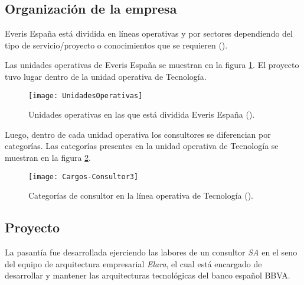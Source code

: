 \subsection{Organización de la empresa}

Everis España está dividida en líneas operativas y por sectores
dependiendo del tipo de servicio/proyecto o conocimientos que se requieren (\cite{MANUAL}).

Las unidades operativas de Everis España se muestran en la figura \ref{unidades}.
El proyecto tuvo lugar dentro de la unidad operativa de Tecnología.

\begin{figure}[h!]
\centering
\texttt{[image: UnidadesOperativas]}
\caption[Unidades Operativas de Everis]{Unidades operativas en las que
        está dividida Everis España (\cite{MANUAL}).}
\label{unidades}
\end{figure}


Luego, dentro de cada unidad operativa los consultores se diferencian por categorías.
Las categorías presentes en la unidad operativa de Tecnología se muestran en la
figura \ref{categorias}.

\begin{figure}[h!]
\centering
\texttt{[image: Cargos-Consultor3]}
\caption[Categorías en Tecnología]{Categorías de consultor en la línea operativa
  de Tecnología (\cite{MANUAL}).}
\label{categorias}
\end{figure}

\subsection{Proyecto}
La pasantía fue desarrollada ejerciendo las labores de un consultor \emph{SA} en
el seno del equipo de arquitectura empresarial \emph{Elara}, el cual está
encargado de desarrollar y mantener las arquitecturas tecnológicas del
banco español BBVA.
